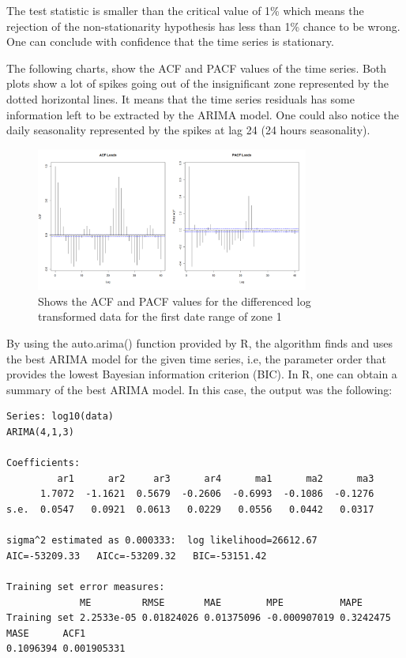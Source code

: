 \documentclass{article} %
\begin{document}
The test statistic is smaller than the critical value of 1\% which means the rejection of the non-stationarity hypothesis has less than 1\% chance to be wrong. One can conclude with confidence that the time series is stationary.

The following charts, show the ACF and PACF values of the time series. Both plots show a lot of spikes going out of the insignificant zone represented by the dotted horizontal lines. It means that the time series residuals has some information left to be extracted by the ARIMA model.
One could also notice the daily seasonality represented by the spikes at lag 24 (24 hours seasonality).

\begin{figure}[H]
  \centering
    \includegraphics[width=0.80\textwidth]{ACFandPACFLoadsRaw}
  \caption{Shows the ACF and PACF values for the differenced log transformed data for the first date range of zone 1 }
\end{figure}

By using the auto.arima() function provided by R, the algorithm finds and uses the best ARIMA model for the given time series, i.e, the parameter order that provides the lowest Bayesian information criterion (BIC).
In R, one can obtain a summary of the best ARIMA model. In this case, the output was the following:
\begin{verbatim}
Series: log10(data) 
ARIMA(4,1,3)                    

Coefficients:
         ar1      ar2     ar3      ar4      ma1      ma2      ma3
      1.7072  -1.1621  0.5679  -0.2606  -0.6993  -0.1086  -0.1276
s.e.  0.0547   0.0921  0.0613   0.0229   0.0556   0.0442   0.0317

sigma^2 estimated as 0.000333:  log likelihood=26612.67
AIC=-53209.33   AICc=-53209.32   BIC=-53151.42

Training set error measures:
             ME         RMSE       MAE        MPE          MAPE      
Training set 2.2533e-05 0.01824026 0.01375096 -0.000907019 0.3242475
MASE      ACF1
0.1096394 0.001905331
\end{verbatim}
\end{document}
